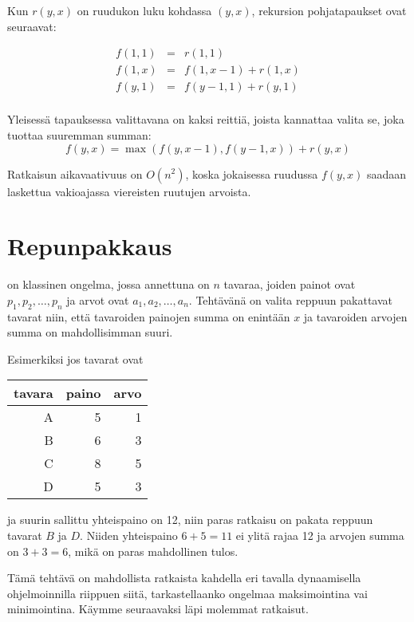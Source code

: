 Kun $r(y,x)$
on ruudukon luku kohdassa $(y,x)$,
rekursion pohjatapaukset ovat seuraavat:

\[
\begin{array}{lcl}
f(1,1) & = & r(1,1) \\
f(1,x) & = & f(1,x-1)+r(1,x) \\
f(y,1) & = & f(y-1,1)+r(y,1)\\
\end{array}
\]

Yleisessä tapauksessa valittavana on
kaksi reittiä,
joista kannattaa valita se,
joka tuottaa suuremman summan:
\[ f(y,x) = \max(f(y,x-1),f(y-1,x))+r(y,x)\]

Ratkaisun aikavaativuus on $O(n^2)$, koska jokaisessa
ruudussa $f(y,x)$ saadaan laskettua vakioajassa
viereisten ruutujen arvoista.

\section{Repunpakkaus}


 on klassinen ongelma,
jossa annettuna on $n$ tavaraa,
joiden painot ovat
$p_1,p_2,\ldots,p_n$ ja arvot ovat
$a_1,a_2,\ldots,a_n$.
Tehtävänä on valita reppuun pakattavat tavarat
niin, että tavaroiden
painojen summa on enintään $x$
ja tavaroiden arvojen summa on mahdollisimman suuri.

\begin{samepage}
Esimerkiksi jos tavarat ovat
\begin{center}
\begin{tabular}{rrr}
tavara & paino & arvo \\
\hline
A & 5 & 1 \\
B & 6 & 3 \\
C & 8 & 5 \\
D & 5 & 3 \\
\end{tabular}
\end{center}
\end{samepage}
ja suurin sallittu yhteispaino on 12,
niin paras ratkaisu on pakata reppuun tavarat $B$ ja $D$.
Niiden yhteispaino $6+5=11$ ei ylitä rajaa 12
ja arvojen summa
on $3+3=6$, mikä on paras mahdollinen tulos.

Tämä tehtävä on mahdollista ratkaista kahdella eri
tavalla dynaamisella ohjelmoinnilla
riippuen siitä, tarkastellaanko ongelmaa
maksimointina vai minimointina.
Käymme seuraavaksi läpi molemmat ratkaisut.

